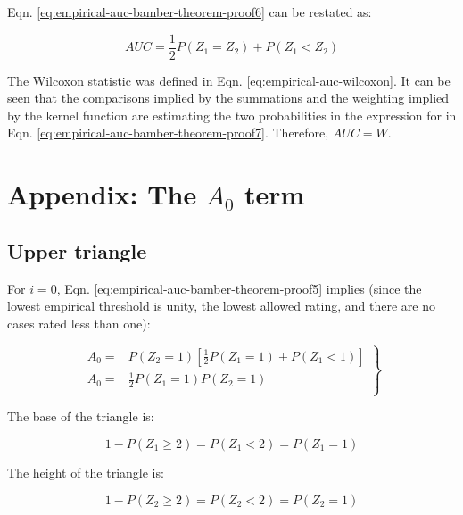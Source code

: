 \documentclass[
]{book}
\begin{document}
Eqn. \eqref{eq:empirical-auc-bamber-theorem-proof6} can be restated as:

\begin{equation}
AUC=\frac{1}{2}P\left ( Z_1 = Z_2 \right ) + P\left ( Z_1 < Z_2 \right )
\label{eq:empirical-auc-bamber-theorem-proof7}
\end{equation}

The Wilcoxon statistic was defined in Eqn. \eqref{eq:empirical-auc-wilcoxon}. It can be seen that the comparisons implied by the summations and the weighting implied by the kernel function are estimating the two probabilities in the expression for in Eqn. \eqref{eq:empirical-auc-bamber-theorem-proof7}. Therefore, \(AUC = W\).

\hypertarget{empirical-auc-bamber-theorem-a0-term}{%
\section{\texorpdfstring{Appendix: The \(A_0\) term}{Appendix: The A\_0 term}}\label{empirical-auc-bamber-theorem-a0-term}}

\hypertarget{upper-triangle}{%
\subsection{Upper triangle}\label{upper-triangle}}

For \(i = 0\), Eqn. \eqref{eq:empirical-auc-bamber-theorem-proof5} implies (since the lowest empirical threshold is unity, the lowest allowed rating, and there are no cases rated less than one):

\begin{equation}
\left. 
\begin{aligned}
A_0 =& P\left ( Z_2 = 1 \right )\left [ \frac{1}{2} P\left ( Z_1=1 \right ) + P\left ( Z_1<1 \right )\right ] \\
A_0 =& \frac{1}{2} P\left ( Z_1=1 \right ) P\left ( Z_2=1 \right )\\
\end{aligned}
\right \}
\end{equation}

The base of the triangle is:

\begin{equation}
1 - P\left ( Z_1 \geq 2 \right )=P\left ( Z_1 < 2 \right )=P\left ( Z_1 = 1 \right )
\end{equation}

The height of the triangle is:

\begin{equation}
1 - P\left ( Z_2 \geq 2 \right )=P\left ( Z_2 < 2 \right )=P\left ( Z_2 = 1 \right )
\end{equation}
\end{document}
